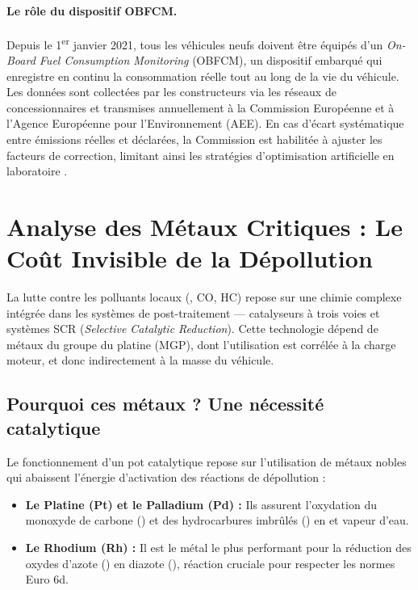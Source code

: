 \documentclass[12pt, a4paper]{article}
\begin{document}
\paragraph{Le rôle du dispositif OBFCM.}
Depuis le 1\textsuperscript{er} janvier 2021, tous les véhicules neufs doivent être équipés d'un \textit{On-Board Fuel Consumption Monitoring} (OBFCM), un dispositif embarqué qui enregistre en continu la consommation réelle tout au long de la vie du véhicule. Les données sont collectées par les constructeurs via les réseaux de concessionnaires et transmises annuellement à la Commission Européenne et à l'Agence Européenne pour l'Environnement (AEE). En cas d'écart systématique entre émissions réelles et déclarées, la Commission est habilitée à ajuster les facteurs de correction, limitant ainsi les stratégies d'optimisation artificielle en laboratoire \cite{obfcm2024}.

\section{Analyse des Métaux Critiques : Le Coût Invisible de la Dépollution}

La lutte contre les polluants locaux (, CO, HC) repose sur une chimie complexe intégrée dans les systèmes de post-traitement --- catalyseurs à trois voies et systèmes SCR (\textit{Selective Catalytic Reduction}). Cette technologie dépend de métaux du groupe du platine (MGP), dont l'utilisation est corrélée à la charge moteur, et donc indirectement à la masse du véhicule.

\subsection{Pourquoi ces métaux ? Une nécessité catalytique}

Le fonctionnement d'un pot catalytique repose sur l'utilisation de métaux nobles qui abaissent l'énergie d'activation des réactions de dépollution :

\begin{itemize}
    \item \textbf{Le Platine (Pt) et le Palladium (Pd) :} Ils assurent l'oxydation du monoxyde de carbone () et des hydrocarbures imbrûlés () en  et vapeur d'eau.
    \item \textbf{Le Rhodium (Rh) :} Il est le métal le plus performant pour la réduction des oxydes d'azote () en diazote (), réaction cruciale pour respecter les normes Euro 6d.
\end{itemize}
\end{document}
